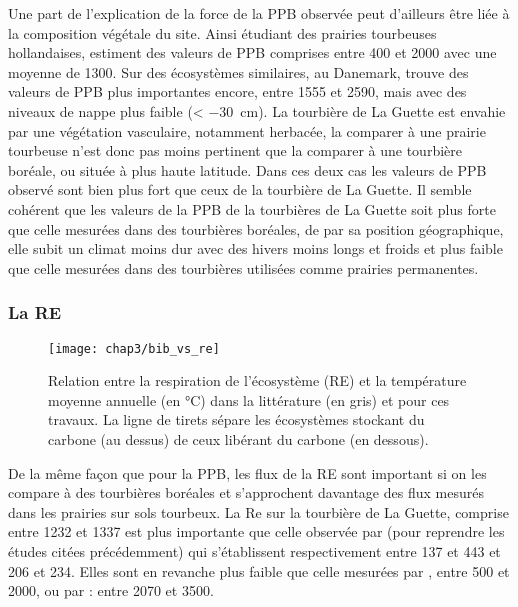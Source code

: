 Une part de l'explication de la force de la PPB observée peut d'ailleurs être liée à la composition végétale du site.
Ainsi \citet{jacobs2007} étudiant des prairies tourbeuses hollandaises, estiment des valeurs de PPB comprises entre 400 et \SI{2000}{\gcma} avec une moyenne de \SI{1300}{\gcma}.
Sur des écosystèmes similaires, au Danemark, \citet{gorres2014} trouve des valeurs de PPB plus importantes encore, entre 1555 et \SI{2590}{\gcma}, mais avec des niveaux de nappe plus faible (< \SI{-30}{\centi\metre}).
La tourbière de La Guette est envahie par une végétation vasculaire, notamment herbacée, la comparer à une prairie tourbeuse n'est donc pas moins pertinent que la comparer à une tourbière boréale, ou située à plus haute latitude.
Dans ces deux cas les valeurs de PPB observé sont bien plus fort que ceux de la tourbière de La Guette.
Il semble cohérent que les valeurs de la PPB de la tourbières de La Guette soit plus forte que celle mesurées dans des tourbières boréales, de par sa position géographique, elle subit un climat moins dur avec des hivers moins longs et froids et plus faible que celle mesurées dans des tourbières utilisées comme prairies permanentes.

\subsubsection{La RE}

\begin{figure}
\centering
\texttt{[image: chap3/bib\_vs\_re]}
\caption{Relation entre la respiration de l'écosystème (RE) et la température moyenne annuelle (en °C) dans la littérature (en gris) et pour ces travaux. La ligne de tirets sépare les écosystèmes stockant du carbone (au dessus) de ceux libérant du carbone (en dessous).}
\label{fig:bib_vs_re}
\end{figure}

De la même façon que pour la PPB, les flux de la RE sont important si on les compare à des tourbières boréales et s'approchent davantage des flux mesurés dans les prairies sur sols tourbeux.
La Re sur la tourbière de La Guette, comprise entre 1232 et \SI{1337}{\gcma} est plus importante que celle observée par \citet{peichl2014,trudeau2014} (pour reprendre les études citées précédemment) qui s'établissent respectivement entre 137 et \SI{443}{\gcma} et 206 et \SI{234}{\gcma}.
Elles sont en revanche plus faible que celle mesurées par \citep{jacobs2007}, entre 500 et \SI{2000}{\gcma}, ou par \citep{gorres2014} : entre 2070 et \SI{3500}{\gcma}. 

